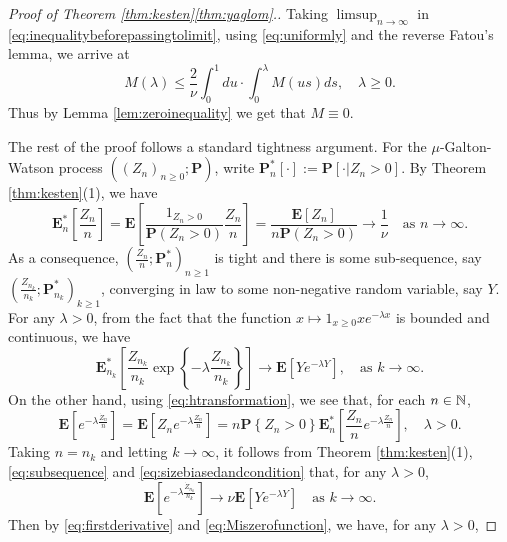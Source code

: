 \documentclass[12pt]{amsart}
\numberwithin{equation}{section}
\newcommand{\prob}{\mathbf P}
\newcommand{\brac}[1]{\left[ #1 \right]}
\newcommand{\set}[1]{\left\{ #1 \right\}}
\newcommand{\expct}{\mathbf E}
\begin{document}
\begin{proof}[Proof of Theorem \ref{thm:kesten}\eqref{thm:yaglom}.]
    Taking $\limsup_{n\to\infty}$ in
    \eqref{eq:inequalitybeforepassingtolimit}, using \eqref{eq:uniformly} and the reverse Fatou's lemma, we arrive at
\begin{equation*}
	    M(\lambda)
    \leq
        \frac{2}{\nu}\int_0^1du
    \cdot
    	\int_0^\lambda M(us)ds,
    \quad
    	\lambda\geq 0.
\end{equation*}
	Thus by Lemma \ref{lem:zeroinequality} we get that $M\equiv 0$.
\par
	The rest of the proof follows a standard tightness argument. 
	For the $\mu$-Galton-Watson process $((Z_n)_{n\ge 0};\prob)$, write $\prob_n^*[\cdot]:=\prob[\cdot|Z_n>0]$.
	By Theorem \ref{thm:kesten}(1), we have
\begin{equation*}
	    \expct_n^*\brac{\frac{Z_n}{n}}
	=
		 \expct\brac{\frac{1_{Z_n>0}}{\prob(Z_n>0)}\frac{Z_n}{n}}
	=
		\frac{\expct\brac{Z_n}}{n\prob(Z_n>0)}
    \to
        \frac{1}{\nu}
   \quad
		\text{as }n\to\infty.
\end{equation*}
	As a consequence, $(\frac{Z_n}{n};\prob_n^*)_{n\ge 1}$ is tight and there is some sub-sequence, say $(\frac{Z_{n_k}}{n_k};\prob_{n_k}^*)_{k\ge 1}$, converging in law to some non-negative random variable, say $Y$.
	For any $\lambda > 0$, from the fact that the function $x\mapsto 1_{x\geq 0}xe^{-\lambda x}$ is bounded and continuous, we have
\begin{equation}
\label{eq:subsequence}
	    \expct_{n_k}^*\brac{\frac{Z_{n_k}}{n_k}\exp\set{-\lambda\frac{Z_{n_k}}{n_k}}}
	\to
	    \expct\brac{Ye^{-\lambda Y}},
	\quad
		\text{as }k\to\infty.
\end{equation}
	On the other hand, using \eqref{eq:htransformation}, we see that, for each $n\in\mathbb N$,
\begin{equation}
\label{eq:sizebiasedandcondition}
	    \expct\brac{e^{-\lambda\frac{\dot Z_n}{n}}}
	=
	    \expct\brac{Z_n e^{-\lambda\frac{Z_n}{n}}}
	=
		n\prob\set{Z_n>0}\expct_n^*\brac{\frac{Z_n}{n}e^{-\lambda\frac{Z_n}{n}}},
	\quad 
		\lambda > 0.
\end{equation}
	Taking $n=n_k$ and letting $k\to\infty$, it follows from Theorem \ref{thm:kesten}(1), \eqref{eq:subsequence} and \eqref{eq:sizebiasedandcondition} that, for any $\lambda >0$,
\begin{equation*}
	    \expct\brac{e^{-\lambda\frac{\dot Z_{n_k}}{n_k}}}
	\to
		\nu\expct\brac{Ye^{-\lambda Y}}
	\quad
		\text{as } k\to \infty.
\end{equation*}
	Then by \eqref{eq:firstderivative} and \eqref{eq:Miszerofunction}, we have, for any $\lambda >0$,

\end{proof}
\end{document}
